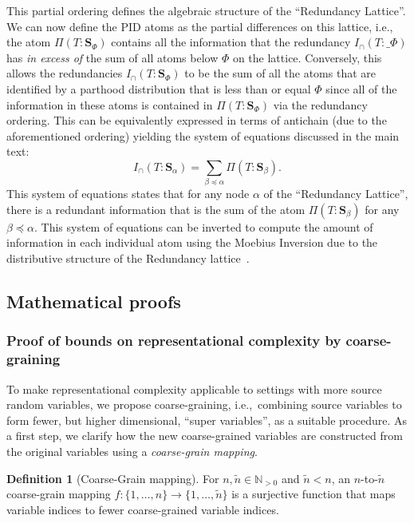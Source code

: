 \documentclass[10pt]{article}
\theoremstyle{definition}
\newtheorem{definition}{Definition}[section]
\theoremstyle{plain}
\begin{document}
This partial ordering defines the algebraic structure of the ``Redundancy Lattice''. We can now define the PID atoms as the partial differences on this lattice, i.e., the atom $\Pi(T:\bm S_\Phi)$ contains all the information that the redundancy $I_\cap(T:\bm_\Phi)$ has \emph{in excess of} the sum of all atoms below $\Phi$ on the lattice. Conversely, this allows the redundancies $I_\cap(T:\bm S_\Phi)$ to be the sum of all the atoms that are identified by a parthood distribution that is less than or equal $\Phi$ since all of the information in these atoms is contained in $\Pi(T:\bm S_\Phi)$ via the redundancy ordering. This can be equivalently expressed in terms of antichain (due to the aforementioned ordering) yielding the system of equations discussed in the main text:    
\begin{equation}
    I_\cap(T: \bm S_\alpha) = \sum_{\beta \preceq \alpha} \Pi(T:\bm S_\beta).
\end{equation}
This system of equations states that for any node $\alpha$ of the ``Redundancy Lattice'', there is a redundant information that is the sum of the atom $\Pi(T:\bm S_\beta)$ for any $\beta \preceq \alpha$. This system of equations can be inverted to compute the amount of information in each individual atom using the Moebius Inversion due to the distributive structure of the Redundancy lattice~\citep{williams_nonnegative_2010}.


\subsection{Mathematical proofs}
\subsubsection{Proof of bounds on representational complexity by coarse-graining}
\label{apx:coarse-graining}

To make representational complexity applicable to settings with more source random variables, we propose coarse-graining, i.e.,~combining source variables to form fewer, but higher dimensional, ``super variables'', as a suitable procedure. As a first step, we clarify how the new coarse-grained variables are constructed from the original variables using a \textit{coarse-grain mapping}.

\begin{definition}[Coarse-Grain mapping]
For $n, \tilde n \in \mathbb{N}_{> 0}$ and $\tilde{n} < n$, an $n$-to-$\tilde n$ coarse-grain mapping $f : \{1, \dots, n\} \to \{1, \dots, \tilde{n}\}$ is a surjective function that maps variable indices to fewer coarse-grained variable indices.
\end{definition}
\end{document}
